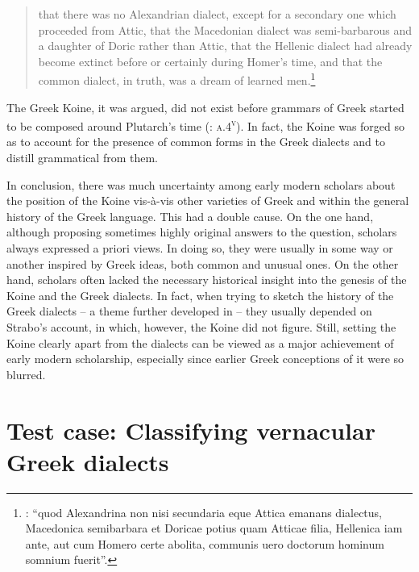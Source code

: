 \begin{quote}
that there was no Alexandrian dialect, except for a secondary one which proceeded from Attic, that the Macedonian dialect was semi-barbarous and a daughter of Doric rather than Attic, that the Hellenic dialect had already become extinct before or certainly during Homer’s time, and that the common dialect, in truth, was a dream of learned men.\footnote{\citet[\textsc{c.2}\textsc{\textsuperscript{v}}]{Kirchmaier1709}: “quod Alexandrina non nisi secundaria eque Attica emanans dialectus, Macedonica semibarbara et Doricae potius quam Atticae filia, Hellenica iam ante, aut cum Homero certe abolita, communis uero doctorum hominum somnium fuerit”.}
\end{quote}

The Greek Koine, it was argued, did not exist before grammars of Greek started to be composed around Plutarch’s time (\citealt{Kirchmaier1709}: \textsc{a.4}\textsc{\textsuperscript{v}}). In fact, the Koine was forged so as to account for the presence of common forms in the Greek dialects and to distill grammatical  from them.

In conclusion, there was much uncertainty among early modern scholars about the position of the Koine vis-à-vis other varieties of Greek and within the general history of the Greek language. This had a double cause. On the one hand, although proposing sometimes highly original answers to the question, scholars always expressed a priori views. In doing so, they were usually in some way or another inspired by Greek ideas, both common and unusual ones. On the other hand, scholars often lacked the necessary historical insight into the genesis of the Koine and the Greek dialects. In fact, when trying to sketch the history of the Greek dialects – a theme further developed in  – they usually depended on Strabo’s account, in which, however, the Koine did not figure. Still, setting the Koine clearly apart from the dialects can be viewed as a major achievement of early modern scholarship, especially since earlier Greek conceptions of it were so blurred.

\section{Test case: Classifying vernacular Greek dialects}\label{sec:2.10}

